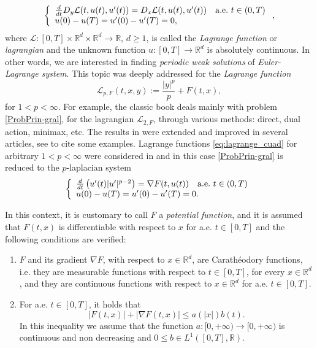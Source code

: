 \documentclass[twoside]{article}
\makeatletter
\theoremstyle{remark}
\newcommand{\labitem}[2]{%
\def\@itemlabel{\textbf{#1}}
\item
\def\@currentlabel{#1}\label{#2}}
\newcommand{\rr}{\mathbb{R}}
\renewcommand{\leq}{\leqslant}
\renewcommand{\geq}{\geqslant}
\newcounter{example}
\makeatother
\begin{document}
\begin{equation}\label{ProbPrin-gral}
    \left\{%
\begin{array}{ll}
  \frac{d}{dt} D_{y}\mathcal{L}(t,u(t),u'(t))= D_{x}\mathcal{L}(t,u(t),u'(t)) \quad \hbox{a.e.}\ t \in (0,T)\\
    u(0)-u(T)=u'(0)-u'(T)=0,
\end{array}%
\right.,
\end{equation}
where $\mathcal{L}:[0,T]\times\rr^d\times\rr^d\to\rr$, $d\geq 1$, is called the \emph{Lagrange function} or \emph{lagrangian} and the unknown function  $u:[0,T]\to\rr^d$ is absolutely continuous. In other words, we are interested in  finding \emph{periodic weak solutions} of \emph{Euler-Lagrange system}. This topic was deeply addressed for the \emph{Lagrange function}
\begin{equation}\label{eq:lagrange_cuad}
\mathcal{L}_{p,F}(t,x,y):=\frac{|y|^p}{p}+F(t,x),
\end{equation}
for $1<p<\infty$. For example, the classic book  \cite{mawhin2010critical} deals mainly with problem \eqref{ProbPrin-gral}, for the lagrangian $\mathcal{L}_{2,F}$, through various methods: direct, dual action, minimax, etc. The results in \cite{mawhin2010critical} were extended and improved in several articles, see  \cite{tang1995periodic,tang1998periodic,wu1999periodic,tang2001periodic,zhao2004periodic}  to cite some examples. Lagrange functions \eqref{eq:lagrange_cuad} for arbitrary $1<p<\infty$ were considered in  \cite{Tian2007192,tang2010periodic} and in this case \eqref{ProbPrin-gral}  is reduced to the $p$-laplacian system
\begin{equation}\label{ProbP-lapla}
    \left\{%
\begin{array}{ll}
   \frac{d}{dt}\left(u'(t)|u'|^{p-2}\right) = \nabla F(t,u(t)) \quad \hbox{a.e.}\ t \in (0,T)\\
    u(0)-u(T)=u'(0)-u'(T)=0.
\end{array}%
\right.
\end{equation}


In this context, it  is customary to call $F$ a  \emph{potential function}, and it is assumed that $F(t,x)$ is differentiable with respect to $x$ for a.e. $t\in [0,T]$ and the following conditions are verified:
\begin{enumerate}
\labitem{(C)}{item:condicion_c} $F$ and its gradient $\nabla F$, with respect to $x\in\rr^d$,  are  Carath\'eodory functions, i.e. they are measurable functions with respect to $t\in [0,T]$, for every  $x\in\rr^d$, and they are continuous functions with  respect to  $x\in\rr^d$ for a.e. $t \in [0,T]$.
 \labitem{(A)}{item:condicion_a}  For   a.e. $t\in [0,T]$, it holds that
\begin{equation}
|F(t,x)| + |\nabla F(t,x)|  \leq a(|x|)b(t).
\end{equation}
In this inequality we assume that the function  $a:[0,+\infty)\to [0,+\infty)$ is continuous and non decreasing and $0\leq b\in L^1([0,T],\rr)$.
\end{enumerate}
\end{document}

